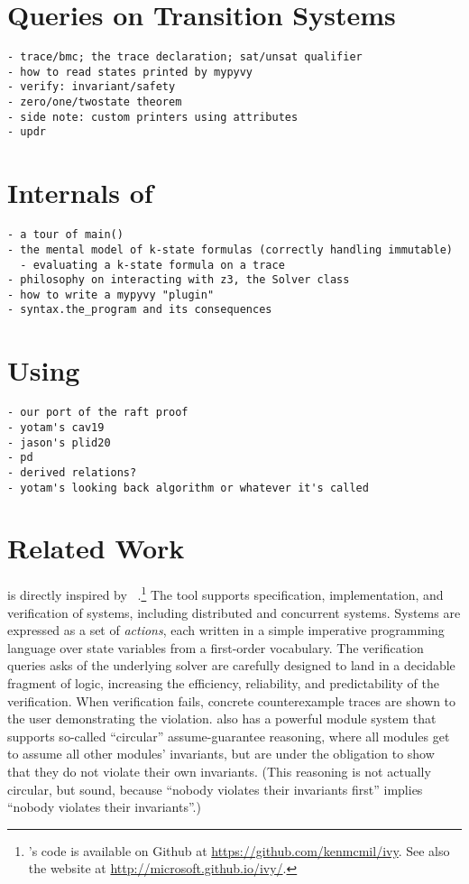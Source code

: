 \section{Queries on Transition Systems}

\begin{verbatim}
- trace/bmc; the trace declaration; sat/unsat qualifier
- how to read states printed by mypyvy
- verify: invariant/safety
- zero/one/twostate theorem
- side note: custom printers using attributes
- updr
\end{verbatim}

\section{Internals of \mypyvy}

\begin{verbatim}
- a tour of main()
- the mental model of k-state formulas (correctly handling immutable)
  - evaluating a k-state formula on a trace
- philosophy on interacting with z3, the Solver class
- how to write a mypyvy "plugin"
- syntax.the_program and its consequences
\end{verbatim}

\section{Using \mypyvy}

\begin{verbatim}
- our port of the raft proof
- yotam's cav19
- jason's plid20
- pd
- derived relations?
- yotam's looking back algorithm or whatever it's called
\end{verbatim}

\section{Related Work}


\mypyvy is directly inspired by \ivy~\cite{Padon-al:PLDI16}.\footnote{
  \ivy's code is available on Github at \url{https://github.com/kenmcmil/ivy}.
  See also the \ivy website at \url{http://microsoft.github.io/ivy/}.
}
%
The \ivy tool supports specification, implementation, and verification of systems,
including distributed and concurrent systems.
%
Systems are expressed as a set of \emph{actions},
each written in a simple imperative programming language
over state variables from a first-order vocabulary.
%
The verification queries \ivy asks of the underlying solver
are carefully designed to land in a decidable fragment of logic,
increasing the efficiency, reliability, and predictability
of the verification.
%
When verification fails, concrete counterexample traces
are shown to the user demonstrating the violation.
%
\ivy{} also has a powerful module system
that supports so-called ``circular'' assume-guarantee reasoning,
where all modules get to assume all other modules' invariants,
but are under the obligation to show that they do not violate
their own invariants.
%
(This reasoning is not actually circular, but sound,
because ``nobody violates their invariants first''
implies ``nobody violates their invariants''.)

